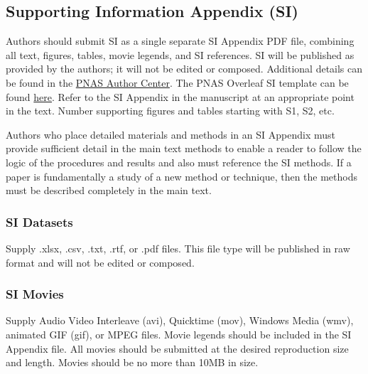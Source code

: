 \documentclass[9pt,twocolumn,twoside]{pnas-new}
\begin{document}
\subsection*{Supporting Information Appendix (SI)}

Authors should submit SI as a single separate SI Appendix PDF file, combining all text, figures, tables, movie legends, and SI references. SI will be published as provided by the authors; it will not be edited or composed. Additional details can be found in the \href{https://www.pnas.org/authors/submitting-your-manuscript#manuscript-formatting-guidelines}{PNAS Author Center}. The PNAS Overleaf SI template can be found \href{https://www.overleaf.com/latex/templates/pnas-template-for-supplementary-information/wqfsfqwyjtsd}{here}. Refer to the SI Appendix in the manuscript at an appropriate point in the text. Number supporting figures and tables starting with S1, S2, etc.

Authors who place detailed materials and methods in an SI Appendix must provide sufficient detail in the main text methods to enable a reader to follow the logic of the procedures and results and also must reference the SI methods. If a paper is fundamentally a study of a new method or technique, then the methods must be described completely in the main text.

\subsubsection*{SI Datasets}

Supply .xlsx, .csv, .txt, .rtf, or .pdf files. This file type will be published in raw format and will not be edited or composed.


\subsubsection*{SI Movies}

Supply Audio Video Interleave (avi), Quicktime (mov), Windows Media (wmv), animated GIF (gif), or MPEG files. Movie legends should be included in the SI Appendix file. All movies should be submitted at the desired reproduction size and length. Movies should be no more than 10MB in size.




\end{document}
